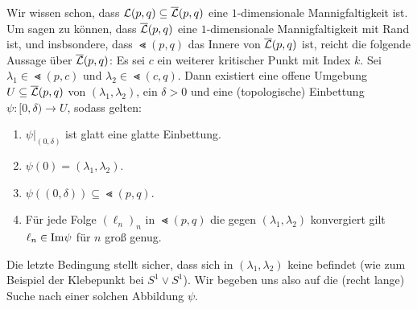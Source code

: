 \begin{bigproof}
    Wir wissen schon, dass ${ \mathcal{L} } (p, q) \subseteq {\overline{\mathcal{L}} }(p, q)$ eine $1$-dimensionale Mannigfaltigkeit ist. 
    Um sagen zu können, dass ${\overline{\mathcal{L}} } (p, q)$ eine $1$-dimensionale Mannigfaltigkeit mit Rand ist, und 
    insbsondere, dass $\Lt (p, q)$ das Innere von ${\overline{\mathcal{L}} }(p, q)$ ist, reicht die folgende Aussage über 
    ${\overline{\mathcal{L}} }(p, q)$:
    Es sei $c$ ein weiterer kritischer Punkt mit Index $k$.
    Sei $\lambda_1 \in \Lt (p, c)$ und $\lambda_2 \in \Lt (c, q)$. Dann existiert eine offene Umgebung
    $U \subseteq {\overline{\mathcal{L}} } (p, q)$ von $(\lambda_1, \lambda_2)$, ein $\delta > 0$ und eine (topologische)
    Einbettung $\psi \colon [0, \delta) \to U$, sodass gelten: 
    \begin{enumerate}
        \item $\psi|_{(0, \delta)}$ ist glatt eine glatte Einbettung.
        \item $\psi(0) = (\lambda_1, \lambda_2)$.
        \item $\psi((0, \delta)) \subseteq \Lt (p, q)$.
        \item Für jede Folge $(\ell_n)_n$ in $\Lt (p, q)$ die gegen $(\lambda_1, \lambda_2)$ konvergiert 
            gilt $\ell_n \in { \operatorname{Im} } \psi$ für $n$ groß genug.
    \end{enumerate} 
    Die letzte Bedingung stellt sicher, dass sich in $(\lambda_1, \lambda_2)$ keine 
     befindet (wie zum Beispiel der Klebepunkt bei $S^1 \vee S^1$).
    Wir begeben uns also auf die (recht lange) Suche nach einer solchen Abbildung $\psi$. 


\end{bigproof}

